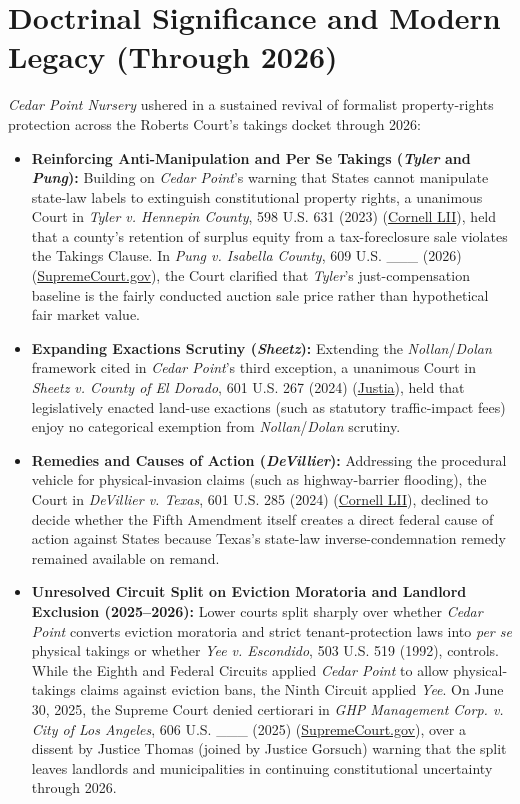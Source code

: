 \documentclass[12pt]{article}
\begin{document}
\section{Doctrinal Significance and Modern Legacy (Through 2026)}

\textit{Cedar Point Nursery} ushered in a sustained revival of formalist property-rights protection across the Roberts Court's takings docket through 2026:
\begin{itemize}
    \item \textbf{Reinforcing Anti-Manipulation and Per Se Takings (\textit{Tyler} and \textit{Pung}):} Building on \textit{Cedar Point}'s warning that States cannot manipulate state-law labels to extinguish constitutional property rights, a unanimous Court in \textit{Tyler v. Hennepin County}, 598 U.S. 631 (2023) (\href{https://www.law.cornell.edu/supremecourt/text/22-166}{Cornell LII}), held that a county's retention of surplus equity from a tax-foreclosure sale violates the Takings Clause. In \textit{Pung v. Isabella County}, 609 U.S. \_\_\_ (2026) (\href{https://www.supremecourt.gov/opinions/25pdf/25-95_dc8e.pdf}{SupremeCourt.gov}), the Court clarified that \textit{Tyler}'s just-compensation baseline is the fairly conducted auction sale price rather than hypothetical fair market value.
    \item \textbf{Expanding Exactions Scrutiny (\textit{Sheetz}):} Extending the \textit{Nollan}/\textit{Dolan} framework cited in \textit{Cedar Point}'s third exception, a unanimous Court in \textit{Sheetz v. County of El Dorado}, 601 U.S. 267 (2024) (\href{https://supreme.justia.com/cases/federal/us/601/22-1074/}{Justia}), held that legislatively enacted land-use exactions (such as statutory traffic-impact fees) enjoy no categorical exemption from \textit{Nollan}/\textit{Dolan} scrutiny.
    \item \textbf{Remedies and Causes of Action (\textit{DeVillier}):} Addressing the procedural vehicle for physical-invasion claims (such as highway-barrier flooding), the Court in \textit{DeVillier v. Texas}, 601 U.S. 285 (2024) (\href{https://www.law.cornell.edu/supremecourt/text/22-913}{Cornell LII}), declined to decide whether the Fifth Amendment itself creates a direct federal cause of action against States because Texas's state-law inverse-condemnation remedy remained available on remand.
    \item \textbf{Unresolved Circuit Split on Eviction Moratoria and Landlord Exclusion (2025--2026):} Lower courts split sharply over whether \textit{Cedar Point} converts eviction moratoria and strict tenant-protection laws into \emph{per se} physical takings or whether \textit{Yee v. Escondido}, 503 U.S. 519 (1992), controls. While the Eighth and Federal Circuits applied \textit{Cedar Point} to allow physical-takings claims against eviction bans, the Ninth Circuit applied \textit{Yee}. On June 30, 2025, the Supreme Court denied certiorari in \textit{GHP Management Corp. v. City of Los Angeles}, 606 U.S. \_\_\_ (2025) (\href{https://www.supremecourt.gov/opinions/24pdf/24-435_m6hn.pdf}{SupremeCourt.gov}), over a dissent by Justice Thomas (joined by Justice Gorsuch) warning that the split leaves landlords and municipalities in continuing constitutional uncertainty through 2026.

\end{itemize}
\end{document}
